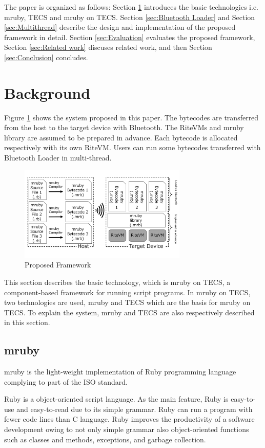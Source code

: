 \documentclass[conference,compsoc]{IEEEtran}
\begin{document}
The paper is organized as follows:
Section \ref{sec:Background} introduces the basic technologies i.e. mruby, TECS and mruby on TECS.
Section \ref{sec:Bluetooth Loader} and Section \ref{sec:Multithread} describe the design and implementation of the proposed framework in detail.
Section \ref{sec:Evaluation} evaluates the proposed framework, Section \ref{sec:Related work} discuses related work, and then Section \ref{sec:Conclusion} concludes.

\section{Background}
\label{sec:Background}
Figure \ref{fig:proposed} shows the system proposed in this paper.
The bytecodes are transferred from the host to the target device with Bluetooth.
The RiteVMs and mruby library are assumed to be prepared in advance.
Each bytecode is allocated respectively with its own RiteVM.
Users can run some bytecodes transferred with Bluetooth Loader in multi-thread.

\begin{figure}[t]
    \centering
    \includegraphics[width=8cm,clip]{figure/proposed.pdf}
    \caption{Proposed Framework}
    \label{fig:proposed}
\end{figure}

This section describes the basic technology, which is mruby on TECS, a component-based framework for running script programs.
In mruby on TECS, two technologies are used, mruby and TECS which are the basis for mruby on TECS.
To explain the system, mruby and TECS are also respectively described in this section.

\subsection{mruby}
\label{sec:mruby}
mruby is the light-weight implementation of Ruby programming language complying to part of the ISO standard.

Ruby is a object-oriented script language.
As the main feature, Ruby is easy-to-use and easy-to-read due to its simple grammar.
Ruby can run a program with fewer code lines than C language.
Ruby improves the productivity of a software development owing to not only simple grammar also object-oriented functions such as classes and methods, exceptions, and garbage collection.
\end{document}
